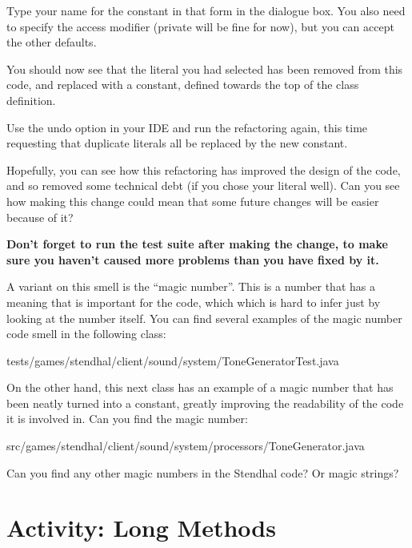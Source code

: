 \documentclass[
]{book}
\newenvironment{Shaded}{\begin{snugshade}}{\end{snugshade}}
\newcommand{\FunctionTok}[1]{\textcolor[rgb]{0.00,0.00,0.00}{#1}}
\newcommand{\NormalTok}[1]{#1}
\begin{document}
Type your name for the constant in that form in the dialogue box. You also need to specify the access modifier (private will be fine for now), but you can accept the other defaults.

You should now see that the literal you had selected has been removed from this code, and replaced with a constant, defined towards the top of the class definition.

Use the undo option in your IDE and run the refactoring again, this time requesting that duplicate literals all be replaced by the new constant.

Hopefully, you can see how this refactoring has improved the design of the code, and so removed some technical debt (if you chose your literal well). Can you see how making this change could mean that some future changes will be easier because of it?

\textbf{Don't forget to run the test suite after making the change, to make sure you haven't caused more problems than you have fixed by it.}

A variant on this smell is the ``magic number''. This is a number that has a meaning that is important for the code, which which is hard to infer just by looking at the number itself. You can find several examples of the magic number code smell in the following class:

\begin{Shaded}
\begin{Highlighting}[]
\NormalTok{tests/games/stendhal/client/sound/system/ToneGeneratorTest.}\FunctionTok{java}
\end{Highlighting}
\end{Shaded}

On the other hand, this next class has an example of a magic number that has been neatly turned into a constant, greatly improving the readability of the code it is involved in. Can you find the magic number:

\begin{Shaded}
\begin{Highlighting}[]
\NormalTok{src/games/stendhal/client/sound/system/processors/ToneGenerator.}\FunctionTok{java}
\end{Highlighting}
\end{Shaded}

Can you find any other magic numbers in the Stendhal code? Or magic strings?

\hypertarget{longmethods}{%
\section{Activity: Long Methods}\label{longmethods}}
\end{document}
